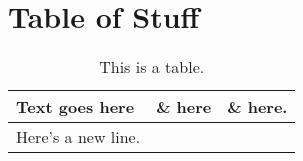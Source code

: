 \section{Table of Stuff}
\label{app:B}


\setcounter{table}{0}

\begin{longtable}{|p{}|p{}|p{}|}
\caption{This is a table.}\\
\hline
Text goes here & \& here & \& here.\\
\hline
Here's a new line. & &\\ %
\hline
\end{longtable}
